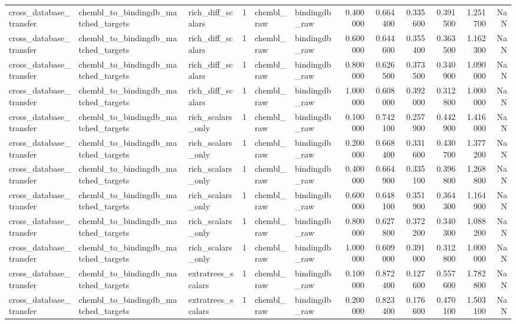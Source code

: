 \begin{longtable}{lllrllrrrrrr}
cross\_database\_transfer & chembl\_to\_bindingdb\_matched\_targets & rich\_diff\_scalars & 1 & chembl\_raw & bindingdb\_raw & 0.400000 & 0.664400 & 0.335600 & 0.391500 & 1.251700 & NaN \\
cross\_database\_transfer & chembl\_to\_bindingdb\_matched\_targets & rich\_diff\_scalars & 1 & chembl\_raw & bindingdb\_raw & 0.600000 & 0.644600 & 0.355400 & 0.363500 & 1.162300 & NaN \\
cross\_database\_transfer & chembl\_to\_bindingdb\_matched\_targets & rich\_diff\_scalars & 1 & chembl\_raw & bindingdb\_raw & 0.800000 & 0.626500 & 0.373500 & 0.340900 & 1.090000 & NaN \\
cross\_database\_transfer & chembl\_to\_bindingdb\_matched\_targets & rich\_diff\_scalars & 1 & chembl\_raw & bindingdb\_raw & 1.000000 & 0.608000 & 0.392000 & 0.312800 & 1.000000 & NaN \\
cross\_database\_transfer & chembl\_to\_bindingdb\_matched\_targets & rich\_scalars\_only & 1 & chembl\_raw & bindingdb\_raw & 0.100000 & 0.742100 & 0.257900 & 0.442900 & 1.416000 & NaN \\
cross\_database\_transfer & chembl\_to\_bindingdb\_matched\_targets & rich\_scalars\_only & 1 & chembl\_raw & bindingdb\_raw & 0.200000 & 0.668400 & 0.331600 & 0.430700 & 1.377200 & NaN \\
cross\_database\_transfer & chembl\_to\_bindingdb\_matched\_targets & rich\_scalars\_only & 1 & chembl\_raw & bindingdb\_raw & 0.400000 & 0.664900 & 0.335100 & 0.396800 & 1.268800 & NaN \\
cross\_database\_transfer & chembl\_to\_bindingdb\_matched\_targets & rich\_scalars\_only & 1 & chembl\_raw & bindingdb\_raw & 0.600000 & 0.648100 & 0.351900 & 0.364300 & 1.164900 & NaN \\
cross\_database\_transfer & chembl\_to\_bindingdb\_matched\_targets & rich\_scalars\_only & 1 & chembl\_raw & bindingdb\_raw & 0.800000 & 0.627800 & 0.372200 & 0.340300 & 1.088200 & NaN \\
cross\_database\_transfer & chembl\_to\_bindingdb\_matched\_targets & rich\_scalars\_only & 1 & chembl\_raw & bindingdb\_raw & 1.000000 & 0.609000 & 0.391000 & 0.312800 & 1.000000 & NaN \\
cross\_database\_transfer & chembl\_to\_bindingdb\_matched\_targets & extratrees\_scalars & 1 & chembl\_raw & bindingdb\_raw & 0.100000 & 0.872400 & 0.127600 & 0.557600 & 1.782800 & NaN \\
cross\_database\_transfer & chembl\_to\_bindingdb\_matched\_targets & extratrees\_scalars & 1 & chembl\_raw & bindingdb\_raw & 0.200000 & 0.823400 & 0.176600 & 0.470100 & 1.503100 & NaN \\

\end{longtable}
